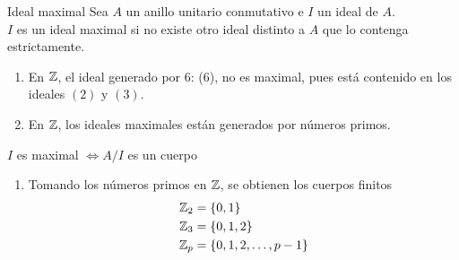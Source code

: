 \documentclass[10pt,t]{beamer}
\begin{document}
\begin{frame}
    \begin{block}{\centering \large Ideal maximal}
        Sea $A$ un anillo unitario conmutativo e $I$ un ideal de $A$.\\[0.3ex]
        $I$ es un ideal maximal si no existe otro ideal distinto a $A$ que lo contenga estrictamente.
    \end{block}

    \begin{plainexample}
        \begin{enumerate}[label=--]
            \item En $\mathbb{Z}$, el ideal generado por 6: (6), no es maximal, pues está contenido en los ideales $(2)$ y $(3)$.
            \item En $\mathbb{Z}$, los ideales maximales están generados por números primos.
        \end{enumerate}
    \end{plainexample}

    \begin{prop}
        \centering $I$ es maximal $\iff A/I$ es un cuerpo
    \end{prop}

    \begin{plainexample}
        \begin{enumerate}[label=--]
            \item Tomando los números primos en $\mathbb{Z}$, se obtienen los cuerpos finitos 
            \vspace*{-1.7em}
            \begin{align*}
                \mathbb{Z}_2 &= \{0,1\}\\
                \mathbb{Z}_3 &= \{0,1,2\}\\
                \mathbb{Z}_p &= \{0,1,2, \ldots, p-1\}
            \end{align*}
        \end{enumerate}
    \end{plainexample}
\end{frame}
\end{document}
